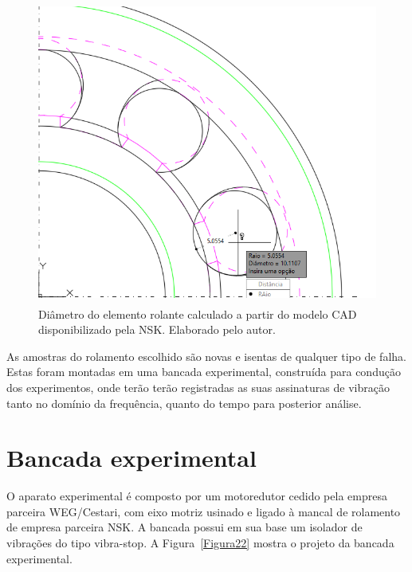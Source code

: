 \documentclass[
	12pt,				
	oneside,			
	a4paper,			
	english,			
	brazil,			
	]{abntex2ppgsi}
\begin{document}
\begin{figure}[H]
\centering
\includegraphics[width=\textwidth,height=100mm,keepaspectratio]{diametro_rolamento}
\caption {Diâmetro do elemento rolante calculado a partir do modelo CAD disponibilizado pela NSK. Elaborado pelo autor.}
\label{diametro_rolamento}
\end{figure} 

As amostras do rolamento escolhido são novas e isentas de qualquer tipo de falha. Estas foram montadas em uma bancada experimental, construída para condução dos experimentos, onde terão terão registradas as suas assinaturas de vibração tanto no domínio da frequência, quanto do tempo para posterior análise. 

\section{\textbf{Bancada experimental}}

O aparato experimental é composto por um motoredutor cedido pela empresa parceira WEG/Cestari, com eixo motriz usinado e ligado à mancal de rolamento de empresa parceira NSK. A bancada possui em sua base um isolador de vibrações do tipo vibra-stop. A Figura~\ref{Figura22} mostra o projeto da bancada experimental. 
\end{document}
